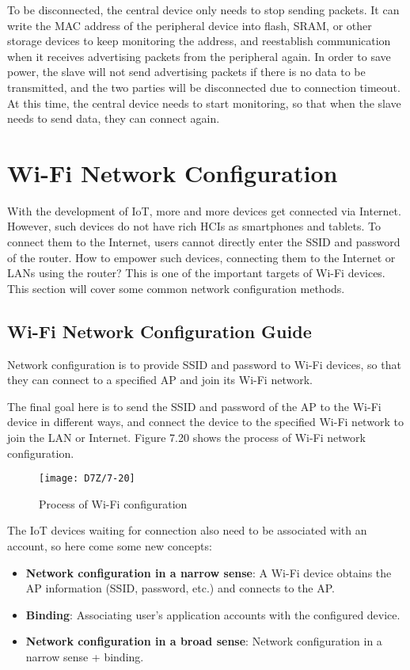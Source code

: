 \documentclass[a4paper,12pt]{book}
\begin{document}
To be disconnected, the central device only needs to stop sending packets. It can write the MAC address of the peripheral device into flash, SRAM, or other storage devices to keep monitoring the address, and reestablish communication when it receives advertising packets from the peripheral again. In order to save power, the slave will not send advertising packets if there is no data to be transmitted, and the two parties will be disconnected due to connection timeout. At this time, the central device needs to start monitoring, so that when the slave needs to send data, they can connect again.

\section{Wi-Fi Network Configuration}
With the development of IoT, more and more devices get connected via Internet. However, such devices do not have rich HCIs as smartphones and tablets. To connect them to the Internet, users cannot directly enter the SSID and password of the router. How to empower such devices, connecting them to the Internet or LANs using the router? This is one of the important targets of Wi-Fi devices. This section will cover some common network configuration methods.

\subsection{Wi-Fi Network Configuration Guide}
Network configuration is to provide SSID and password to Wi-Fi devices, so that they can connect to a specified AP and join its Wi-Fi network.

The final goal here is to send the SSID and password of the AP to the Wi-Fi device in different ways, and connect the device to the specified Wi-Fi network to join the LAN or Internet. Figure 7.20 shows the process of Wi-Fi network configuration.

\begin{figure}[!h]
    \centering
    \texttt{[image: D7Z/7-20]}
    \caption{Process of Wi-Fi configuration}
\end{figure}

The IoT devices waiting for connection also need to be associated with an account, so here come some new concepts:

\begin{itemize}[noitemsep]
    \item \textbf{Network configuration in a narrow sense}: A Wi-Fi device obtains the AP information (SSID, password, etc.) and connects to the AP.
    \item \textbf{Binding}: Associating user's application accounts with the configured device.
    \item \textbf{Network configuration in a broad sense}: Network configuration in a narrow sense + binding.
\end{itemize}
\end{document}
